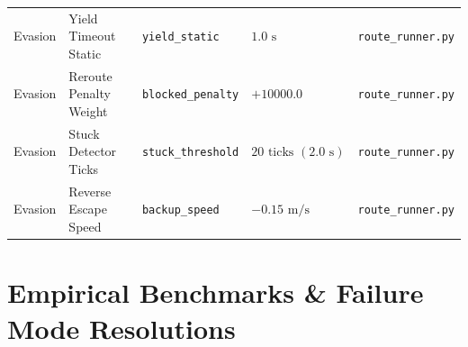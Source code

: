 \documentclass[10pt,a4paper]{article}
\begin{document}
\begin{center}
\begin{tabular}{|l|l|l|l|l|}
Evasion & Yield Timeout Static & \texttt{yield\_static} & $1.0\text{ s}$ & \texttt{route\_runner.py} \\
Evasion & Reroute Penalty Weight & \texttt{blocked\_penalty} & $+10000.0$ & \texttt{route\_runner.py} \\
Evasion & Stuck Detector Ticks & \texttt{stuck\_threshold} & $20\text{ ticks } (2.0\text{ s})$ & \texttt{route\_runner.py} \\
Evasion & Reverse Escape Speed & \texttt{backup\_speed} & $-0.15\text{ m/s}$ & \texttt{route\_runner.py} \\
\hline
\end{tabular}
\end{center}

\section{Empirical Benchmarks \& Failure Mode Resolutions}
\end{document}
